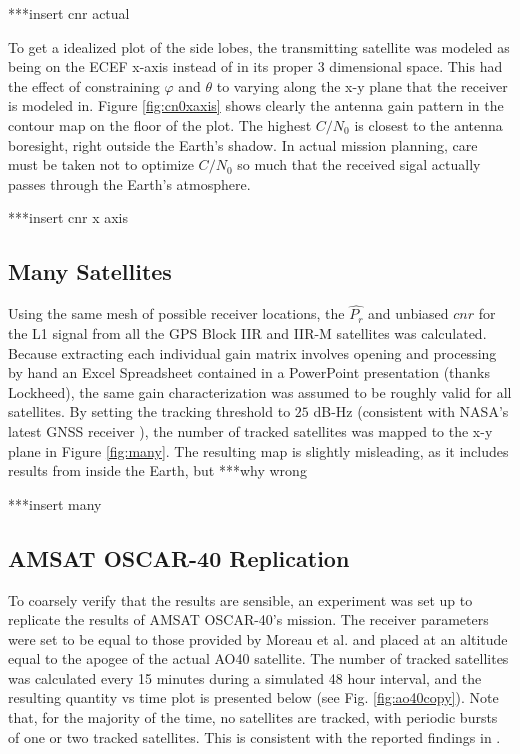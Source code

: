 \documentclass[11pt]{article}
\newcommand{\cnr}{C/N_0}
\begin{document}
***insert cnr actual

To get a idealized plot of the side lobes, the transmitting satellite was modeled as being on the ECEF x-axis instead of in its proper 3 dimensional space. This had the effect of constraining $\varphi$ and $\theta$ to varying along the x-y plane that the receiver is modeled in. Figure \ref{fig:cn0xaxis} shows clearly the antenna gain pattern in the contour map on the floor of the plot. The highest $\cnr$ is closest to the antenna boresight, right outside the Earth's shadow. In actual mission planning, care must be taken not to optimize $\cnr$ so much that the received sigal actually passes through the Earth's atmosphere.

***insert cnr x axis

\subsection{Many Satellites}
Using the same mesh of possible receiver locations, the $\hat{P_r}$ and unbiased $cnr$ for the L1 signal from all the GPS Block IIR and IIR-M satellites was calculated. Because extracting each individual gain matrix involves opening and processing by hand an Excel Spreadsheet contained in a PowerPoint presentation (thanks Lockheed), the same gain characterization was assumed to be roughly valid for all satellites. By setting the tracking threshold to $25$ dB-Hz (consistent with NASA's latest GNSS receiver \cite{ssv}), the number of tracked satellites was mapped to the x-y plane in Figure \ref{fig:many}. The resulting map is slightly misleading, as it includes results from inside the Earth, but ***why wrong

***insert many

\subsection{AMSAT OSCAR-40 Replication}
To coarsely verify that the results are sensible, an experiment was set up to replicate the results of AMSAT OSCAR-40's mission. The receiver parameters were set to be equal to those provided by Moreau et al. and placed at an altitude equal to the apogee of the actual AO40 satellite. The number of tracked satellites was calculated every 15 minutes during a simulated 48 hour interval, and the resulting quantity vs time plot is presented below (see Fig. \ref{fig:ao40copy}). Note that, for the majority of the time, no satellites are tracked, with periodic bursts of one or two tracked satellites. This is consistent with the reported findings in \cite{ao40}.
\end{document}
